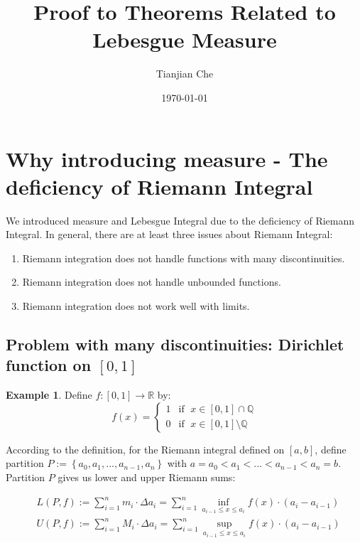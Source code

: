\documentclass[reqno]{amsart}
\theoremstyle{definition}
\newtheorem{example}{Example}
\begin{document}
\author{Tianjian Che}
\title{Proof to Theorems Related to Lebesgue Measure}
\date{\today}
\maketitle

\section{Why introducing measure - The deficiency of Riemann Integral}
We introduced measure and Lebesgue Integral due to the deficiency of Riemann Integral. In general, there are at least three issues about Riemann Integral:
\begin{enumerate}
\item Riemann integration does not handle functions with many discontinuities.
\item Riemann integration does not handle unbounded functions.
\item Riemann integration does not work well with limits.
\end{enumerate}
\subsection{Problem with many discontinuities: Dirichlet function on $[0, 1]$}
\begin{example}
Define $f:[0,1] \rightarrow \mathbb{R}$ by:
$$
f(x) = 
\begin{cases}
1 & \mbox{if }\; x \in [0, 1]\cap\mathbb{Q}\\
0 & \mbox{if }\; x \in [0, 1]\setminus\mathbb{Q}
\end{cases}
$$
\end{example}

According to the definition, for the Riemann integral defined on $[a, b]$, define partition $P:= \left\{a_{0}, a_{1}, ...,a_{n-1}, a_{n}\right\}$ with $a = a_{0} < a_{1} < ... < a_{n-1} < a_{n} = b$. Partition $P$ gives us lower and upper Riemann sums:

\begin{align*}
&L(P, f):= \sum\limits^{n}_{i=1}m_{i}\cdot\Delta a_{i} = \sum\limits^{n}_{i=1}\inf_{\scriptscriptstyle a_{i-1}\leq x \leq a_{i}}{f(x)\cdot(a_{i}-a_{i-1})}\\
&U(P, f):= \sum\limits^{n}_{i=1}M_{i}\cdot\Delta a_{i} = \sum\limits^{n}_{i=1}\sup_{\scriptscriptstyle a_{i-1}\leq x \leq a_{i}}{f(x)\cdot(a_{i}-a_{i-1})}
\end{align*}
\end{document}
